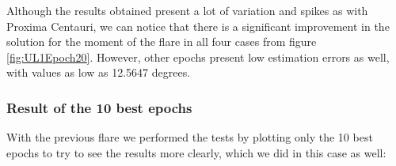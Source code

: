 Although the results obtained present a lot of variation and spikes as with Proxima Centauri, we can notice that there is a significant improvement in the solution for the moment of the flare in all four cases from figure \ref{fig:UL1Epoch20}. However, other epochs present low estimation errors as well, with values as low as 12.5647 degrees.

\clearpage

\subsubsection{Result of the 10 best epochs}

With the previous flare we performed the tests by plotting only the 10 best epochs to try to see the results more clearly, which we did in this case as well:

